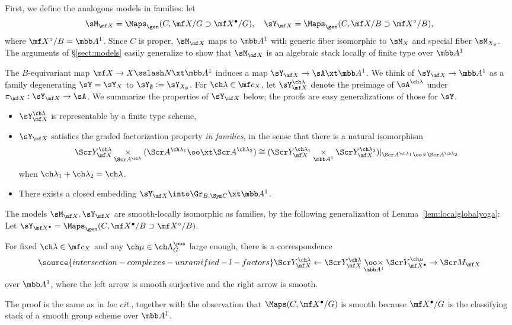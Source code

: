 First, we define the analogous models in families: let
\[ \sM_{\mf X} = \Maps_\gen(C, \mf X/G \supset \mf X^\bullet/G), \quad
\sY_{\mf X} = \Maps_\gen(C, \mf X/B \supset \mf X^\circ/B), \]
where $\mf X^\circ/B = \mbb A^1$.
Since $C$ is proper, $\sM_{\mf X}$ maps to $\mbb A^1$
with generic fiber isomorphic to $\sM_X$ and special fiber $\sM_{X_\emptyset}$.
The arguments of \S\ref{sect:models} easily generalize to
show that $\sM_{\mf X}$ is an algebraic stack locally of finite type over $\mbb A^1$

The $B$-equivariant map $\mf X \to X\sslash N \xt \mbb A^1$ induces
a map $\sY_{\mf X} \to \sA \xt \mbb A^1$. We think of $\sY_{\mf X}\to \mbb A^1$
as a family degenerating $\sY=\sY_X$ to $\sY_\emptyset := \sY_{X_\emptyset}$.
For $\ch\lambda\in \mf c_X$, let $\sY_{\mf X}^{\ch\lambda}$
denote the preimage of $\sA^{\ch\lambda}$ under $\pi_{\mf X} : \sY_{\mf X} \to \sA$.
We summarize the properties of $\sY_{\mf X}$ below; the proofs
are easy generalizations of those for $\sY$.
\begin{itemize}
\item $\sY_{\mf X}^{\ch\lambda}$ is representable by a finite type scheme,
\item $\sY_{\mf X}$ satisfies the graded factorization property \emph{in families},
in the sense that there is a natural isomorphism
\[
\Scr Y_{\mf X}^{\ch\lambda} \underset{\Scr A^{\ch\lambda}}\times
(\Scr A^{\ch\lambda_1} \oo\xt \Scr A^{\ch\lambda_2})
\cong
(\Scr Y_{\mf X}^{\ch\lambda_1} \underset{\mbb A^1}\times \Scr Y_{\mf X}^{\ch\lambda_2})|_{\Scr A^{\ch\lambda_1}\oo\times \Scr A^{\ch\lambda_2}}
\]
when $\ch\lambda_1+\ch\lambda_2=\ch\lambda$.
\item There exists a closed embedding $\sY_{\mf X} \into \Gr_{B,\Sym C} \xt \mbb A^1$.
\end{itemize}

The models $\sM_{\mf X}, \sY_{\mf X}$ are smooth-locally isomorphic
as families, by the following generalization of Lemma~\ref{lem:localglobalyoga}:
Let $\sY_{\mf X^\bullet} = \Maps_\gen(C, \mf X^\bullet/B \supset \mf X^\circ/B)$.

\begin{lem}
\notready\label{lem:yoga-fam}
For fixed $\ch\lambda\in \mf c_X$ and any $\ch\mu\in \ch\Lambda^\pos_G$ large enough,
there is a correspondence
\begin{equation}\label{e:Ycorrespondence}
\source{intersection-complexes-unramified-l-factors}
    \Scr Y^{\ch\lambda}_{\mf X} \leftarrow \Scr Y^{\ch\lambda}_{\mf X} \mathbin{\underset{\mbb A^1}{\oo\times}} \Scr Y^{\ch\mu}_{\mf X^\bullet} \to \Scr M_{\mf X}
\end{equation}
over $\mbb A^1$, where the left arrow is smooth surjective and the right arrow is smooth.
\end{lem}
The proof is the same as in \emph{loc cit.}, together with the observation that
$\Maps(C, \mf X^\bullet/G)$ is smooth because $\mf X^\bullet/G$ is the classifying stack
of a smooth group scheme over $\mbb A^1$.

